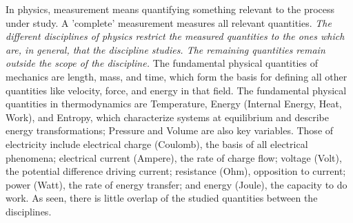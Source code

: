 In physics, measurement means quantifying something 
relevant to the process under study.  A 'complete' measurement
measures all relevant quantities. \textit{The different disciplines of physics restrict the measured quantities to the ones which are, in general, that the discipline studies.
The remaining quantities remain outside the scope of the discipline.}
The fundamental physical quantities of mechanics are length, mass, and time, which form the basis for defining all other quantities like velocity, force, and energy in that field.
The fundamental physical quantities in thermodynamics are Temperature, Energy (Internal Energy, Heat, Work), and Entropy, which characterize systems at equilibrium and describe energy transformations; Pressure and Volume are also key variables. 
Those of electricity include electrical charge (Coulomb), the basis of all electrical phenomena; electrical current (Ampere), the rate of charge flow; voltage (Volt), the potential difference driving current; resistance (Ohm), opposition to current; power (Watt), the rate of energy transfer; and energy (Joule), the capacity to do work. 
As seen, there is little overlap of the studied quantities
between the disciplines. 

